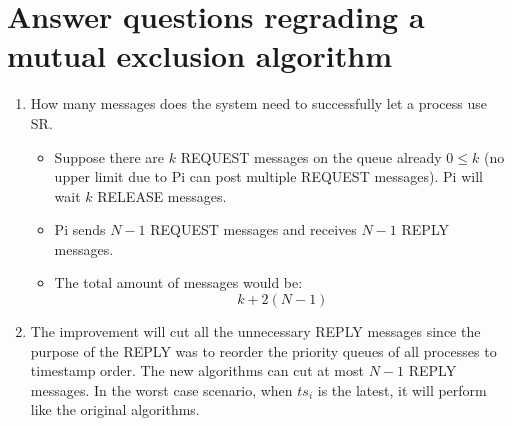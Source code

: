 \documentclass[11pt,a4paper]{article}
\begin{document}
\section{Answer questions regrading a mutual exclusion algorithm}
\begin{enumerate}[label=\alph*)]
	\item How many messages does the system need to successfully let a process use SR. 
	\begin{itemize}
		\item Suppose there are $k$ REQUEST messages on the queue already $0 \leq k$ (no upper limit due to Pi can post multiple REQUEST messages). Pi will wait $k$ RELEASE messages.
		\item Pi sends $N-1$ REQUEST messages and receives $N-1$ REPLY messages.
		\item The total amount of messages would be:
		\[k + 2(N-1)\]
	\end{itemize}
	\item The improvement will cut all the unnecessary REPLY messages since the purpose of the REPLY was to reorder the priority queues of all processes to timestamp order. The new algorithms can cut at most $N - 1$ REPLY messages. In the worst case scenario, when $ts_i$ is the latest, it will perform like the original algorithms.
\end{enumerate}
\end{document}
